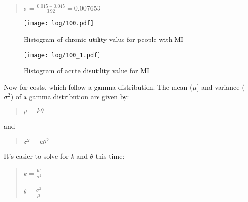 \documentclass[11pt]{article}
\begin{document}
\begin{quote}
\begin{math}
\sigma = \frac{0.015-0.045}{3.92} = 0.007653
\end{math}
\end{quote}

\color{Blue4}
\begin{figure}
    \centering
    \texttt{[image: log/100.pdf]}
    \caption{Histogram of chronic utility value for people with MI}
    \label{PSAhist5}
\end{figure}
\begin{figure}
    \centering
    \texttt{[image: log/100\_1.pdf]}
    \caption{Histogram of acute disutility value for MI}
    \label{PSAhist15}
\end{figure}
\begin{stlog}\end{stlog}
\color{black}

Now for costs, which follow a gamma distribution. The mean (\begin{math} \mu \end{math}) 
and variance (\begin{math} \sigma^2 \end{math}) of a gamma distribution are given by:

\begin{quote}
\begin{math} 
\mu = k \theta
\end{math}
\end{quote}

and

\begin{quote}
\begin{math} 
\sigma^2 = k \theta^2
\end{math}
\end{quote}

It's easier to solve for \begin{math} k \end{math} and \begin{math} \theta \end{math} this time: 

\begin{quote}
\begin{math} 
k = \frac{\mu^2}{\sigma^2}
\end{math} \\
\\
\begin{math} 
\theta = \frac{\sigma^2}{\mu}
\end{math}
\end{quote}
\end{document}

